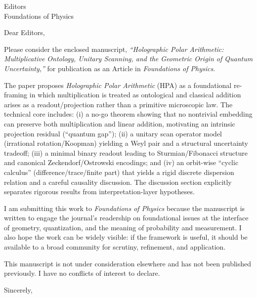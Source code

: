\documentclass[11pt]{letter}
\begin{document}
\begin{letter}{Editors\\Foundations of Physics}

\date{15 December 2025}

\opening{Dear Editors,}

Please consider the enclosed manuscript, \emph{``Holographic Polar Arithmetic: Multiplicative Ontology, Unitary Scanning, and the Geometric Origin of Quantum Uncertainty,''} for publication as an Article in \emph{Foundations of Physics}.

The paper proposes \emph{Holographic Polar Arithmetic} (HPA) as a foundational re-framing in which multiplication is treated as ontological and classical addition arises as a readout/projection rather than a primitive microscopic law. The technical core includes: (i) a no-go theorem showing that no nontrivial embedding can preserve both multiplication and linear addition, motivating an intrinsic projection residual (``quantum gap''); (ii) a unitary scan operator model (irrational rotation/Koopman) yielding a Weyl pair and a structural uncertainty tradeoff; (iii) a minimal binary readout leading to Sturmian/Fibonacci structure and canonical Zeckendorf/Ostrowski encodings; and (iv) an orbit-wise ``cyclic calculus'' (difference/trace/finite part) that yields a rigid discrete dispersion relation and a careful causality discussion. The discussion section explicitly separates rigorous results from interpretation-layer hypotheses.

I am submitting this work to \emph{Foundations of Physics} because the manuscript is written to engage the journal's readership on foundational issues at the interface of geometry, quantization, and the meaning of probability and measurement. I also hope the work can be widely visible: if the framework is useful, it should be available to a broad community for scrutiny, refinement, and application.

This manuscript is not under consideration elsewhere and has not been published previously. I have no conflicts of interest to declare.

\closing{Sincerely,}

\end{letter}
\end{document}
